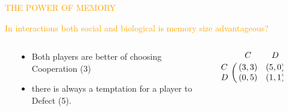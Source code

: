 \documentclass[usenames,dvipsnames,t]{beamer}
\begin{document}
\begin{columns}
    \begin{column}{\linewidth}
    \vspace{1cm}

    \centering
    \textcolor{orange}{\fontsize{180}{400} \selectfont THE POWER OF MEMORY}
    \vspace{0.5cm}

    \Large\textcolor{orange}{In interactions both social and biological is memory
    size advantageous?}
    \end{column}
\end{columns}
\begin{columns}
    \begin{column}{.1\linewidth}
    \end{column}
    \begin{column}{.2\linewidth}
        \vspace{1.1cm}

        \begin{itemize}
            \item Both players are better of choosing Cooperation (3)
            \item there is always a temptation for a player to Defect (5).
        \end{itemize}
    \end{column}
    \begin{column}{.35\linewidth}
        \vspace{0.1cm}

        \large{
        \begin{equation*}\label{eq:payoff_matrix_symb}
             \bordermatrix{~ & C & D \cr
                              C & (3, 3) & (5, 0) \cr
                              D & (0, 5) & (1, 1) \cr}
            \end{equation*}}
    \end{column}

    \begin{column}{.3\linewidth}
        \begin{center}
            
        \end{center}
    \end{column}
    \begin{column}{.1\linewidth}
    \end{column}
\end{columns}
\end{document}
